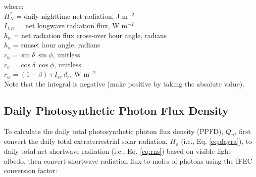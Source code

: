 \noindent where: \\
\indent $H_N^{\ast}$ = daily nighttime net radiation, J m$^{-2}$\\
\indent $I_{LW}$ = net longwave radiation flux, W m$^{-2}$\\
\indent $h_n$ = net radiation flux cross-over hour angle, radians\\
\indent $h_s$ = sunset hour angle, radians\\
\indent $r_u = \sin\delta\: \sin\phi$, unitless \\
\indent $r_v = \cos\delta\: \cos\phi$, unitless \\
\indent $r_w = \left(1-\beta\right)\:\tau\: I_{sc}\: d_r$, W m$^{-2}$\\

\noindent Note that the integral is negative (make positive by taking the absolute value).

\subsection{Daily Photosynthetic Photon Flux Density}
\label{sec:dppfd}
To calculate the daily total photosynthetic photon flux density (PPFD), $Q_n$, first convert the daily total extraterrestrial solar radiation, $H_o$ (i.e., Eq. \ref{eq:dayra}), to daily total net shortwave radiation (i.e., Eq. \ref{eq:rns}) based on visible light albedo, then convert shortwave radiation flux to moles of photons using the fFEC conversion factor:

